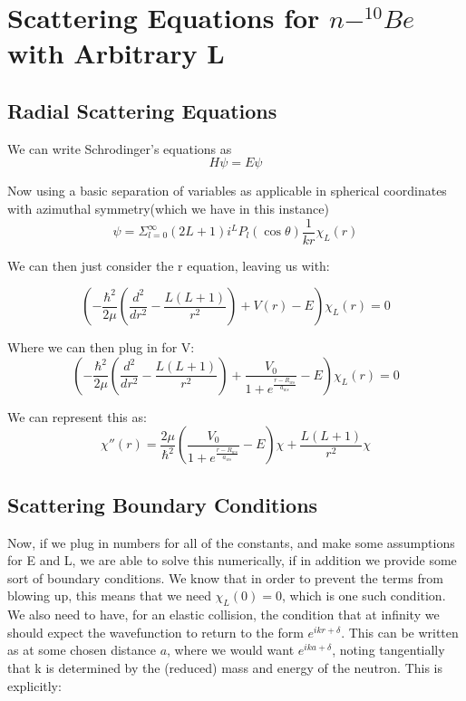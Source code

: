 \documentclass[11pt]{article} %
\begin{document}
\section{Scattering Equations for  $n-^{10}Be $ with Arbitrary L}


\subsection{Radial Scattering Equations}
We can write Schrodinger's equations as 
\begin{equation}
H\psi=E\psi
\end{equation}

Now using a basic separation of variables as applicable in spherical coordinates with azimuthal symmetry(which we have in this instance)\\

\begin{equation}
\psi=\Sigma_{l=0}^\infty (2L+1)i^LP_l(\cos\theta)\frac{1}{kr}\chi_L(r)
\end{equation}

We can then just consider the r equation, leaving us with:

\begin{equation}
(-\frac{\hbar^2}{2\mu}(\frac{d^2}{dr^2}-\frac{L(L+1)}{r^2})+V(r)-E)\chi_L(r)=0
\end{equation}

Where we can then plug in for V:\\
\begin{equation}
(-\frac{\hbar^2}{2\mu}(\frac{d^2}{dr^2}-\frac{L(L+1)}{r^2})+\frac{V_0}{1+e^{\frac{r-R_{ws}}{a_{ws}}}}-E)\chi_L(r)=0
\end{equation}

We can represent this as:\\

\begin{equation}
\boxed{\chi''(r)=\frac{2\mu}{\hbar^2}(\frac{V_0}{1+e^{\frac{r-R_{ws}}{a_{ws}}}}-E)\chi+\frac{L(L+1)}{r^2}\chi}
\end{equation}
\subsection{Scattering Boundary Conditions}
Now, if we plug in numbers for all of the constants, and make some assumptions for E and L, we are able to solve this numerically, if in addition we provide some sort of boundary conditions. We know that in order to prevent the terms from blowing up, this means that we need $\chi_L(0)=0$, which is one such condition. We also need to have, for an elastic collision, the condition that at infinity we should expect the wavefunction to return to the form $e^{ikr+\delta}$. This can be written as at some chosen distance $a$, where we would want $e^{ika+\delta}$, noting tangentially that k is determined by the (reduced) mass and energy of the neutron. This is explicitly:\\
\end{document}
